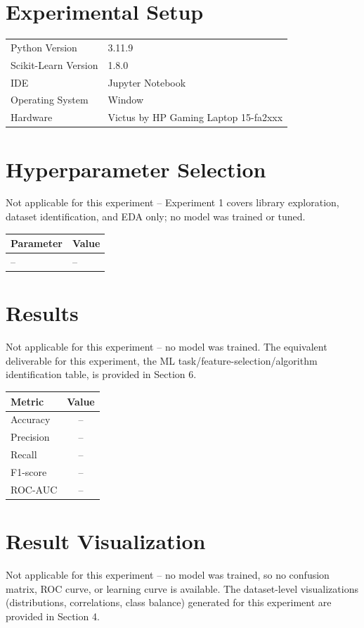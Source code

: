 \documentclass[12pt,a4paper]{article}
\begin{document}
\section{Experimental Setup}
\begin{tabular}{ll}
\toprule
Python Version & 3.11.9\\
Scikit-Learn Version & 1.8.0\\
IDE & Jupyter Notebook \\
Operating System & Window\\
Hardware &  Victus by HP Gaming Laptop 15-fa2xxx\\
\bottomrule
\end{tabular}

\section{Hyperparameter Selection}
Not applicable for this experiment -- Experiment 1 covers library exploration, dataset
identification, and EDA only; no model was trained or tuned.

\begin{tabular}{ll}
\toprule
Parameter & Value\\
\midrule
-- & -- \\
\bottomrule
\end{tabular}

\section{Results}
Not applicable for this experiment -- no model was trained. The equivalent deliverable for
this experiment, the ML task/feature-selection/algorithm identification table, is provided in
Section 6.

\begin{tabular}{lc}
\toprule
Metric & Value\\
\midrule
Accuracy & -- \\
Precision & -- \\
Recall & -- \\
F1-score & -- \\
ROC-AUC & -- \\
\bottomrule
\end{tabular}

\section{Result Visualization}
Not applicable for this experiment -- no model was trained, so no confusion matrix, ROC
curve, or learning curve is available. The dataset-level visualizations (distributions,
correlations, class balance) generated for this experiment are provided in Section 4.
\end{document}
